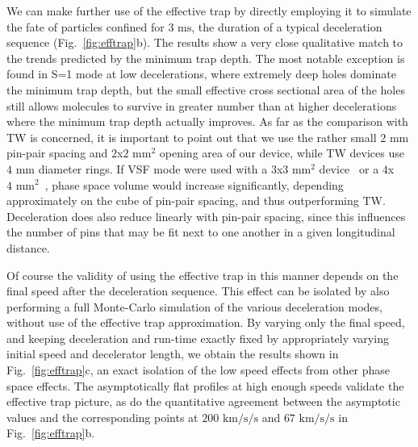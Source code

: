 We can make further use of the effective trap by directly employing it to simulate the fate of particles confined for $3\text{ ms}$, the duration of a typical deceleration sequence (Fig.~\ref{fig:efftrap}b). 
The results show a very close qualitative match to the trends predicted by the minimum trap depth. 
The most notable exception is found in S=1 mode at low decelerations, where extremely deep holes dominate the minimum trap depth, but the small effective cross sectional area of the holes still allows molecules to survive in greater number than at higher decelerations where the minimum trap depth actually improves.
As far as the comparison with TW is concerned, it is important to point out that we use the rather small $2\text{ mm}$ pin-pair spacing and $2$x$2\text{ mm}^2$ opening area of our device, while TW devices use $4\text{ mm}$ diameter rings.
If VSF mode were used with a $3$x$3\text{ mm}^2$ device~\cite{Scharfenberg2009} or a $4$x$4\text{ mm}^2$~\cite{VandeMeerakker2005}, phase space volume would increase significantly, depending approximately on the cube of pin-pair spacing, and thus outperforming TW. 
Deceleration does also reduce linearly with pin-pair spacing, since this influences the number of pins that may be fit next to one another in a given longitudinal distance.

Of course the validity of using the effective trap in this manner depends on the final speed after the deceleration sequence.
This effect can be isolated by also performing a full Monte-Carlo simulation of the various deceleration modes, without use of the effective trap approximation.
By varying only the final speed, and keeping deceleration and run-time exactly fixed by appropriately varying initial speed and decelerator length, we obtain the results shown in Fig.~\ref{fig:efftrap}c, an exact isolation of the low speed effects from other phase space effects.
The asymptotically flat profiles at high enough speeds validate the effective trap picture, as do the quantitative agreement between the asymptotic values and the corresponding points at $200\text{ km/s/s}$ and $67\text{ km/s/s}$ in Fig.~\ref{fig:efftrap}b. 

